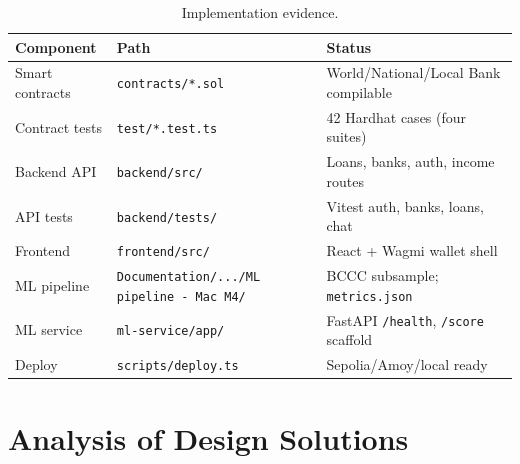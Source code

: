 \documentclass[12pt,a4paper]{report}
\newcommand{\tableheadcolor}{\rowcolor{TableHeadBg}}
\begin{document}
\label{sec:implementation-evidence}

\begin{table}[H]
\centering
\caption[Implementation evidence]{Implementation evidence.}
\label{tab:implementation-evidence}
\small
\begin{tabular}{@{}p{3.2cm}p{4.4cm}p{6.6cm}@{}}
\toprule
\tableheadcolor
\textbf{Component} & \textbf{Path} & \textbf{Status} \\
\midrule
Smart contracts & \texttt{contracts/*.sol} & World/National/Local Bank compilable \\
Contract tests & \texttt{test/*.test.ts} & 42 Hardhat cases (four suites) \\
Backend API & \texttt{backend/src/} & Loans, banks, auth, income routes \\
API tests & \texttt{backend/tests/} & Vitest auth, banks, loans, chat \\
Frontend & \texttt{frontend/src/} & React + Wagmi wallet shell \\
ML pipeline & \texttt{Documentation/.../ML pipeline - Mac M4/} & BCCC subsample; \texttt{metrics.json} \\
ML service & \texttt{ml-service/app/} & FastAPI \texttt{/health}, \texttt{/score} scaffold \\
Deploy & \texttt{scripts/deploy.ts} & Sepolia/Amoy/local ready \\
\bottomrule
\end{tabular}
\end{table}

\section{Analysis of Design Solutions}
\label{sec:analysis-design-solutions}
\end{document}
